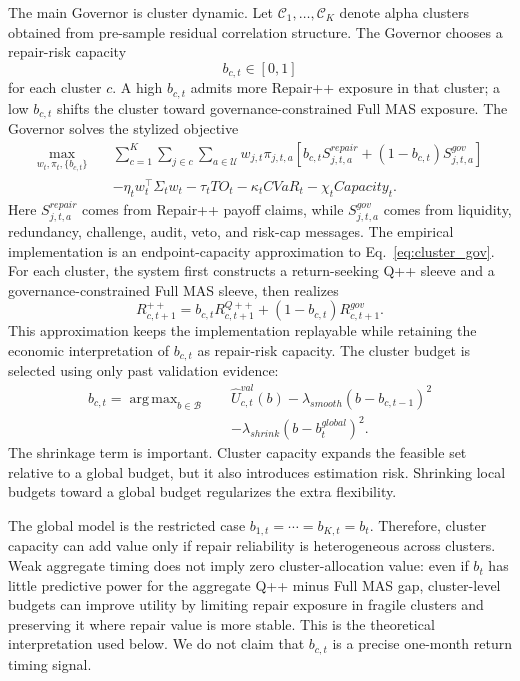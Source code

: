\documentclass[sigconf,nonacm]{acmart}
\newcommand{\calC}{\mathcal{C}}
\newcommand{\calU}{\mathcal{U}}
\newcommand{\calB}{\mathcal{B}}
\DeclareMathOperator{\argmax}{arg\,max}
\begin{document}
The main Governor is cluster dynamic. Let \(\calC_1,\ldots,\calC_K\) denote alpha clusters obtained from pre-sample residual correlation structure. The Governor chooses a repair-risk capacity
\[
b_{c,t}\in[0,1]
\]
for each cluster \(c\). A high \(b_{c,t}\) admits more Repair++ exposure in that cluster; a low \(b_{c,t}\) shifts the cluster toward governance-constrained Full MAS exposure. The Governor solves the stylized objective
\begin{equation}
\begin{aligned}
\max_{w_t,\pi_t,\{b_{c,t}\}}\quad
&\sum_{c=1}^{K}\sum_{j\in c}\sum_{a\in\calU}
w_{j,t}\pi_{j,t,a}
\left[b_{c,t}S^{repair}_{j,t,a}+(1-b_{c,t})S^{gov}_{j,t,a}\right] \\
&-\eta_t w_t^\top\Sigma_t w_t-\tau_t TO_t-\kappa_t CVaR_t-\chi_t Capacity_t .
\end{aligned}
\label{eq:cluster_gov}
\end{equation}
Here \(S^{repair}_{j,t,a}\) comes from Repair++ payoff claims, while \(S^{gov}_{j,t,a}\) comes from liquidity, redundancy, challenge, audit, veto, and risk-cap messages. The empirical implementation is an endpoint-capacity approximation to Eq.~\eqref{eq:cluster_gov}. For each cluster, the system first constructs a return-seeking Q++ sleeve and a governance-constrained Full MAS sleeve, then realizes
\[
R^{++}_{c,t+1}=b_{c,t}R^{Q++}_{c,t+1}+(1-b_{c,t})R^{gov}_{c,t+1}.
\]
This approximation keeps the implementation replayable while retaining the economic interpretation of \(b_{c,t}\) as repair-risk capacity. The cluster budget is selected using only past validation evidence:
\begin{equation}
\begin{aligned}
b_{c,t}=\argmax_{b\in\calB}\quad
&\widehat U^{val}_{c,t}(b)
-\lambda_{smooth}(b-b_{c,t-1})^2  \\
&-\lambda_{shrink}(b-b^{global}_{t})^2 .
\end{aligned}
\label{eq:budget}
\end{equation}
The shrinkage term is important. Cluster capacity expands the feasible set relative to a global budget, but it also introduces estimation risk. Shrinking local budgets toward a global budget regularizes the extra flexibility.

The global model is the restricted case \(b_{1,t}=\cdots=b_{K,t}=b_t\). Therefore, cluster capacity can add value only if repair reliability is heterogeneous across clusters. Weak aggregate timing does not imply zero cluster-allocation value: even if \(b_t\) has little predictive power for the aggregate Q++ minus Full MAS gap, cluster-level budgets can improve utility by limiting repair exposure in fragile clusters and preserving it where repair value is more stable. This is the theoretical interpretation used below. We do not claim that \(b_{c,t}\) is a precise one-month return timing signal.
\end{document}
